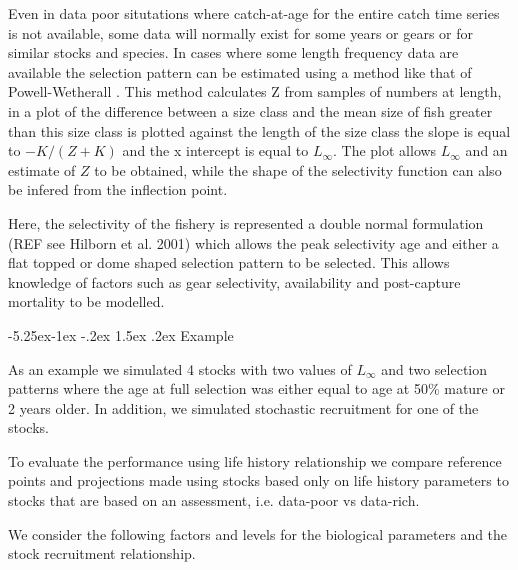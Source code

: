 \documentclass[a4paper, 10pt]{article}
\makeatletter
\renewcommand{\section}{\@startsection{section}{1}{\z@}%
 {-5.25ex\@plus -1ex \@minus -.2ex}%
 {1.5ex \@plus .2ex}%
 {\normalfont\bfseries}}
\makeatother
\begin{document}
Even in data poor situtations where catch-at-age for the entire catch time series
is not available, some data will normally exist for some years or gears or for similar
stocks and species. In cases where some length frequency data are available the selection
pattern can be estimated using a method like that of Powell-Wetherall \citep{wetherall1987estimating}.
This method calculates Z from samples of numbers at length, in a plot of the difference
between a size class and the mean size of fish  greater than this size class is plotted
against the length of the size class the slope is equal to $-K/(Z+K)$ and the x intercept
is equal to $L_{\infty}$. The plot allows $L_{\infty}$ and an estimate of $Z$ to
be obtained, while the shape of the selectivity function can also be infered from the inflection point.

Here, the selectivity of the fishery is represented a double normal formulation (REF see Hilborn et al. 2001) which
allows the peak selectivity age and either a flat topped or dome shaped selection pattern to be selected.
This allows knowledge of factors such as gear selectivity, availability and post-capture mortality to be modelled.

\section{Example}

As an example we simulated 4 stocks with two values of $L_{\infty}$ and two selection
patterns where the age at full selection was either equal to age at 50\% mature or 2 years
older. In addition, we simulated stochastic recruitment for one of the stocks.


To evaluate the performance using life history relationship we compare reference points
and projections made using stocks based only on life history parameters to stocks that
are based on an assessment, i.e. data-poor vs data-rich.

We consider the following factors and levels for the biological parameters and the stock recruitment relationship.
\end{document}
